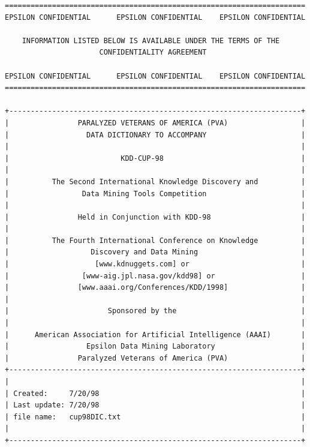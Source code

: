 \documentclass[
  11pt,
  a4paper,
  DIV=12,captions=tableheading,oneside,titlepage]{scrbook}
\begin{document}
\begin{verbatim}
======================================================================
EPSILON CONFIDENTIAL      EPSILON CONFIDENTIAL    EPSILON CONFIDENTIAL

    INFORMATION LISTED BELOW IS AVAILABLE UNDER THE TERMS OF THE  
                      CONFIDENTIALITY AGREEMENT                

EPSILON CONFIDENTIAL      EPSILON CONFIDENTIAL    EPSILON CONFIDENTIAL
======================================================================

+--------------------------------------------------------------------+
|                PARALYZED VETERANS OF AMERICA (PVA)                 |
|                  DATA DICTIONARY TO ACCOMPANY                      |
|                                                                    |
|                          KDD-CUP-98                                |
|                                                                    |
|          The Second International Knowledge Discovery and          |
|                 Data Mining Tools Competition                      |
|                                                                    |
|                Held in Conjunction with KDD-98                     |
|                                                                    |
|          The Fourth International Conference on Knowledge          |
|                   Discovery and Data Mining                        |
|                    [www.kdnuggets.com] or                          |
|                 [www-aig.jpl.nasa.gov/kdd98] or                    |
|                [www.aaai.org/Conferences/KDD/1998]                 |
|                                                                    |
|                       Sponsored by the                             |
|                                                                    |
|      American Association for Artificial Intelligence (AAAI)       |
|                  Epsilon Data Mining Laboratory                    |
|                Paralyzed Veterans of America (PVA)                 |
+--------------------------------------------------------------------+
|                                                                    |
| Created:     7/20/98                                               |
| Last update: 7/20/98                                               |
| file name:   cup98DIC.txt                                          |
|                                                                    |
+--------------------------------------------------------------------+


\end{verbatim}
\end{document}

